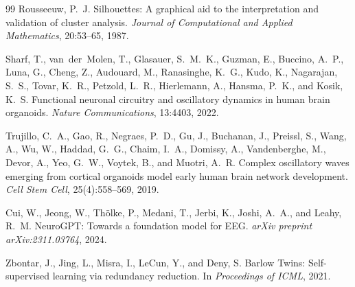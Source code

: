 \documentclass{article}
\begin{document}
\begin{thebibliography}{99}
Rousseeuw, P.~J.
\newblock Silhouettes: A graphical aid to the interpretation and validation of cluster analysis.
\newblock \emph{Journal of Computational and Applied Mathematics}, 20:53--65, 1987.

Sharf, T., van~der~Molen, T., Glasauer, S.~M.~K., Guzman, E., Buccino, A.~P., Luna, G., Cheng, Z., Audouard, M., Ranasinghe, K.~G., Kudo, K., Nagarajan, S.~S., Tovar, K.~R., Petzold, L.~R., Hierlemann, A., Hansma, P.~K., and Kosik, K.~S.
\newblock Functional neuronal circuitry and oscillatory dynamics in human brain organoids.
\newblock \emph{Nature Communications}, 13:4403, 2022.

Trujillo, C.~A., Gao, R., Negraes, P.~D., Gu, J., Buchanan, J., Preissl, S., Wang, A., Wu, W., Haddad, G.~G., Chaim, I.~A., Domissy, A., Vandenberghe, M., Devor, A., Yeo, G.~W., Voytek, B., and Muotri, A.~R.
\newblock Complex oscillatory waves emerging from cortical organoids model early human brain network development.
\newblock \emph{Cell Stem Cell}, 25(4):558--569, 2019.

Cui, W., Jeong, W., Th\"{o}lke, P., Medani, T., Jerbi, K., Joshi, A.~A., and Leahy, R.~M.
\newblock NeuroGPT: Towards a foundation model for EEG.
\newblock \emph{arXiv preprint arXiv:2311.03764}, 2024.

Zbontar, J., Jing, L., Misra, I., LeCun, Y., and Deny, S.
\newblock Barlow Twins: Self-supervised learning via redundancy reduction.
\newblock In \emph{Proceedings of ICML}, 2021.

\end{thebibliography}
\end{document}
